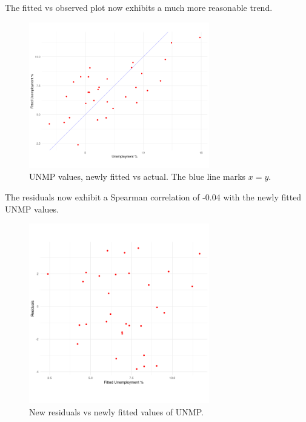 \documentclass[10pt]{article}
\begin{document}
    The fitted vs observed plot now exhibits a much more reasonable trend.

    \begin{figure}[H]
    \begin{center}
        \includegraphics[width=0.7\textwidth]{scatter_reduced.png}
    \end{center}
    \caption{UNMP values, newly fitted vs actual. The blue line marks $x = y$.}
    \label{fig:scatter_reduced}
    \end{figure}

    The residuals now exhibit a Spearman correlation of -0.04 with the newly fitted
    UNMP values.

    \begin{figure}[H]
    \begin{center}
        \includegraphics[width=0.7\textwidth]{residuals_reduced.png}
    \end{center}
    \caption{New residuals vs newly fitted values of UNMP.}
    \label{fig:residuals_reduced}
    \end{figure}
\end{document}
